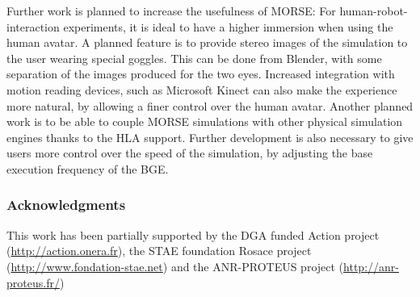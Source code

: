 \documentclass{llncs}
\begin{document}
Further work is planned to increase the usefulness of MORSE:
For human-robot-interaction experiments, it is ideal to have a higher
immersion when using the human avatar.  A planned feature is to provide stereo
images of the simulation to the user wearing special goggles. This can be done
from Blender, with some separation of the images produced for the two eyes.
Increased integration with motion reading devices, such as Microsoft Kinect can
also make the experience more natural, by allowing a finer control over the
human avatar.
Another planned work is to be able to couple MORSE simulations with
other physical simulation engines thanks to the HLA support.
Further development is also necessary to give users more control over the speed
of the simulation, by adjusting the base execution frequency of the BGE.

\subsubsection*{Acknowledgments}
This work has been partially supported by the DGA funded Action project
(\url{http://action.onera.fr}), the STAE foundation Rosace project
(\url{http://www.fondation-stae.net}) and the ANR-PROTEUS
project (\url{http://anr-proteus.fr/})


%
% 

\end{document}
